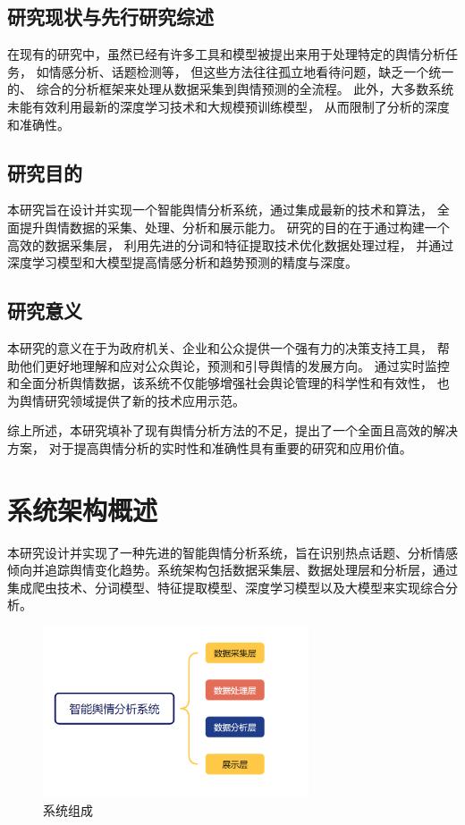 \documentclass[UTF8,a4paper,15pt,titlepage,oneside]{ctexbook}
\begin{document}
\subsection{研究现状与先行研究综述}

在现有的研究中，虽然已经有许多工具和模型被提出来用于处理特定的舆情分析任务，
如情感分析、话题检测等，
但这些方法往往孤立地看待问题，缺乏一个统一的、
综合的分析框架来处理从数据采集到舆情预测的全流程。
此外，大多数系统未能有效利用最新的深度学习技术和大规模预训练模型，
从而限制了分析的深度和准确性。

\subsection{研究目的}

本研究旨在设计并实现一个智能舆情分析系统，通过集成最新的技术和算法，
全面提升舆情数据的采集、处理、分析和展示能力。
研究的目的在于通过构建一个高效的数据采集层，
利用先进的分词和特征提取技术优化数据处理过程，
并通过深度学习模型和大模型提高情感分析和趋势预测的精度与深度。

\subsection{研究意义}


本研究的意义在于为政府机关、企业和公众提供一个强有力的决策支持工具，
帮助他们更好地理解和应对公众舆论，预测和引导舆情的发展方向。
通过实时监控和全面分析舆情数据，该系统不仅能够增强社会舆论管理的科学性和有效性，
也为舆情研究领域提供了新的技术应用示范。

综上所述，本研究填补了现有舆情分析方法的不足，提出了一个全面且高效的解决方案，
对于提高舆情分析的实时性和准确性具有重要的研究和应用价值。

\section{系统架构概述}

本研究设计并实现了一种先进的智能舆情分析系统，旨在识别热点话题、分析情感倾向并追踪舆情变化趋势。系统架构包括数据采集层、数据处理层和分析层，通过集成爬虫技术、分词模型、特征提取模型、深度学习模型以及大模型来实现综合分析。


\begin{figure}[H]
  \centering
  \includegraphics[width=0.7\textwidth,keepaspectratio=false]{pictures/45.png} %
  \caption{系统组成}
  
\end{figure}
\end{document}
